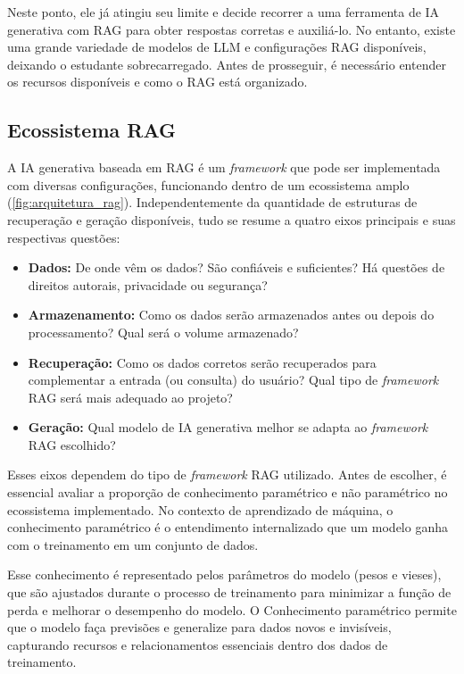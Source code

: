 \documentclass[a4paper, 12pt]{article}
\begin{document}
    Neste ponto, ele já atingiu seu limite e decide recorrer a uma ferramenta de IA generativa com RAG para obter respostas corretas e auxiliá-lo. No entanto, existe uma grande variedade de modelos de LLM e configurações RAG disponíveis, deixando o estudante sobrecarregado. Antes de prosseguir, é necessário entender os recursos disponíveis e como o RAG está organizado.

    \subsection{Ecossistema RAG}

    A IA generativa baseada em RAG é um \textit{framework} que pode ser implementada com diversas configurações, funcionando dentro de um ecossistema amplo (\ref{fig:arquitetura_rag}). Independentemente da quantidade de estruturas de recuperação e geração disponíveis, tudo se resume a quatro eixos principais e suas respectivas questões:
    
    \begin{itemize}
        \item \textbf{Dados:} De onde vêm os dados? São confiáveis e suficientes? Há questões de direitos autorais, privacidade ou segurança?
        \item \textbf{Armazenamento:} Como os dados serão armazenados antes ou depois do processamento? Qual será o volume armazenado?
        \item \textbf{Recuperação:} Como os dados corretos serão recuperados para complementar a entrada (ou consulta) do usuário? Qual tipo de \textit{framework} RAG será mais adequado ao projeto?
        \item \textbf{Geração:} Qual modelo de IA generativa melhor se adapta ao \textit{framework} RAG escolhido?
    \end{itemize} 

    Esses eixos dependem do tipo de \textit{framework} RAG utilizado. Antes de escolher, é essencial avaliar a proporção de conhecimento paramétrico e não paramétrico no ecossistema implementado. No contexto de aprendizado de máquina, o conhecimento paramétrico é o entendimento internalizado que um modelo ganha com o treinamento em um conjunto de dados. 
    
    Esse conhecimento é representado pelos parâmetros do modelo (pesos e vieses), que são ajustados durante o processo de treinamento para minimizar a função de perda e melhorar o desempenho do modelo. O Conhecimento paramétrico permite que o modelo faça previsões e generalize para dados novos e invisíveis, capturando recursos e relacionamentos essenciais dentro dos dados de treinamento.
    
\end{document}
